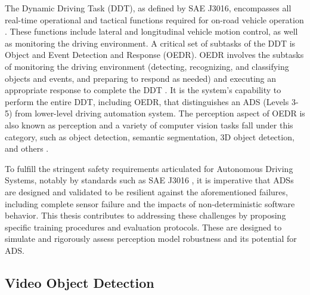 
The Dynamic Driving Task (DDT), as defined by SAE J3016, encompasses all real-time operational and tactical functions required for on-road vehicle operation \cite{sae:j3016:2021apr}. These functions include lateral and longitudinal vehicle motion control, as well as monitoring the driving environment. A critical set of subtasks of the DDT is Object and Event Detection and Response (OEDR). OEDR involves the subtasks of monitoring the driving environment (detecting, recognizing, and classifying objects and events, and preparing to respond as needed) and executing an appropriate response to complete the DDT \cite{sae:j3016:2021apr}. It is the system's capability to perform the entire DDT, including OEDR, that distinguishes an ADS (Levels 3-5) from lower-level driving automation system. The perception aspect of OEDR is also known as perception and a variety of computer vision tasks fall under this category, such as object detection, semantic segmentation, 3D object detection, and others \cite{yurtseverSurveyAutonomousDriving2020}.

To fulfill the stringent safety requirements articulated for Autonomous Driving Systems, notably by standards such as SAE J3016 \cite{sae:j3016:2021apr}, it is imperative that ADSs are designed and validated to be resilient against the aforementioned failures, including complete sensor failure and the impacts of non-deterministic software behavior. This thesis contributes to addressing these challenges by proposing specific training procedures and evaluation protocols. These are designed to simulate and rigorously assess perception model robustness and its potential for ADS.

\subsection{Video Object Detection} \label{Background:VideoObjectDetection}


